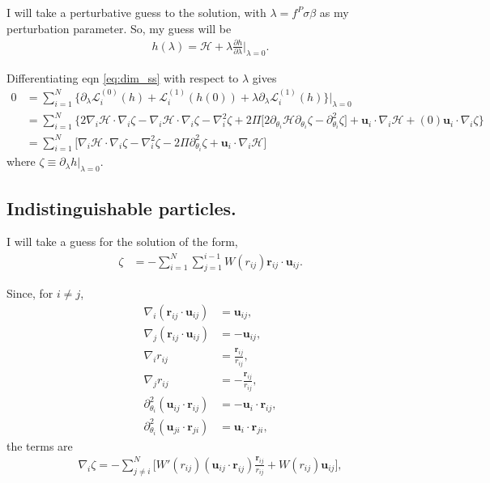 \documentclass{article}
\begin{document}
I will take a perturbative guess to the solution, with $\lambda=f^P\sigma\beta$
as my perturbation parameter. So, my guess will be
\begin{align}\label{eq:hperturb}
  h(\lambda) = \mathcal{H}
  + \lambda\frac{\partial h}{\partial \lambda}\bigg|_{\lambda=0}.
\end{align}

Differentiating eqn \ref{eq:dim_ss} with respect to $\lambda$ gives
\begin{align}\label{eq:first_perturb_DE}
  0
  &=\sum_{i=1}^N\big\{\partial_{\lambda}\mathcal{L}_i^{(0)}(h)
    + \mathcal{L}_i^{(1)}(h(0))
    +\lambda\partial_{\lambda}\mathcal{L}_i^{(1)}
    (h)\big\}\bigg|_{\lambda=0}\nonumber\\
  &=\sum_{i=1}^N\big\{2\nabla_i \mathcal{H}\cdot\nabla_i\zeta
    - \nabla_i\mathcal{H}\cdot\nabla_i\zeta
    -\nabla_i^2\zeta+2\Pi
    \big[2\partial_{\theta_i}\mathcal{H}\partial_{\theta_i}\zeta
    -\partial_{\theta_i}^2\zeta\big]
    + \bm{u}_i\cdot\nabla_i\mathcal{H}
    +(0)\bm{u}_i\cdot\nabla_i\zeta\big\}\nonumber\\
  &=\sum_{i=1}^N\big[\nabla_i \mathcal{H}\cdot\nabla_i\zeta
    -\nabla_i^2\zeta - 2\Pi
    \partial_{\theta_i}^2\zeta
    + \bm{u}_i\cdot\nabla_i\mathcal{H}\big]
\end{align}
where $\zeta\equiv\partial_{\lambda}h|_{\lambda=0}$.

\subsection{Indistinguishable particles.}

I will take a guess for the solution of the form,
\begin{align}\label{eq:zetaform}
  \zeta &= -\sum_{i=1}^N\sum_{j=1}^{i-1}
      W(r_{ij})\bm{r}_{ij}\cdot\bm{u}_{ij}.
\end{align}

Since, for $i\neq j$,
\begin{align}
  \nabla_i(\bm{r}_{ij}\cdot\bm{u}_{ij}) &= \bm{u}_{ij},\\
  \nabla_j(\bm{r}_{ij}\cdot\bm{u}_{ij}) &= -\bm{u}_{ij},\\
  \nabla_i r_{ij} &=\frac{\bm{r}_{ij}}{r_{ij}},\\
  \nabla_j r_{ij} &=-\frac{\bm{r}_{ij}}{r_{ij}},\\
  \partial_{\theta_i}^2(\bm{u}_{ij}\cdot\bm{r}_{ij})&=-\bm{u}_i\cdot\bm{r}_{ij},\\
  \partial_{\theta_i}^2(\bm{u}_{ji}\cdot\bm{r}_{ji})&=\bm{u}_i\cdot\bm{r}_{ji},
\end{align}
the terms are
\begin{align}
  \nabla_{i}\zeta = -\sum_{j\neq i}^N \bigg[W'(r_{ij})
  (\bm{u}_{ij}\cdot\bm{r}_{ij})\frac{\bm{r}_{ij}}{r_{ij}}
  +W(r_{ij})\bm{u}_{ij}\bigg],
\end{align}
\end{document}
